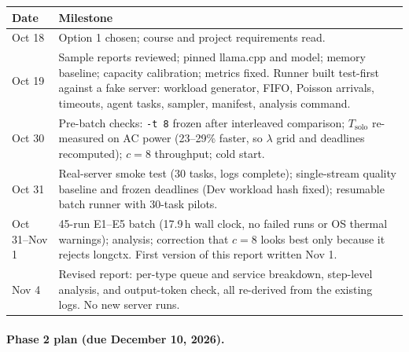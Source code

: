 \documentclass{article}
\begin{document}
\begin{center}
\footnotesize
\begin{tabular}{@{}p{1.0in}p{5.6in}@{}}
\toprule
Date & Milestone \\
\midrule
Oct 18 & Option 1 chosen; course and project requirements read. \\
Oct 19 & Sample reports reviewed; pinned llama.cpp and model; memory baseline; capacity calibration; metrics fixed. Runner built test-first against a fake server: workload generator, FIFO, Poisson arrivals, timeouts, agent tasks, sampler, manifest, analysis command. \\
Oct 30 & Pre-batch checks: \texttt{-t 8} frozen after interleaved comparison; $T_{\mathrm{solo}}$ re-measured on AC power (23--29\% faster, so $\lambda$ grid and deadlines recomputed); $c{=}8$ throughput; cold start. \\
Oct 31 & Real-server smoke test (30 tasks, logs complete); single-stream quality baseline and frozen deadlines (Dev workload hash fixed); resumable batch runner with 30-task pilots. \\
Oct 31--Nov 1 & 45-run E1--E5 batch (17.9\,h wall clock, no failed runs or OS thermal warnings); analysis; correction that $c{=}8$ looks best only because it rejects longctx. First version of this report written Nov 1. \\
Nov 4 & Revised report: per-type queue and service breakdown, step-level analysis, and output-token check, all re-derived from the existing logs. No new server runs. \\
\bottomrule
\end{tabular}
\end{center}

\paragraph{Phase 2 plan (due December 10, 2026).}
\end{document}
